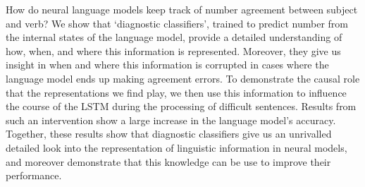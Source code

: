 How do neural language models keep track of number agreement between subject and verb? We show that ‘diagnostic classifiers', trained to predict number from the internal states of the language model, provide a detailed understanding of how, when, and where this information is represented. Moreover, they give us insight in when and where this information is corrupted in cases where the language model ends up making agreement errors. To demonstrate the causal role that the representations we find play, we then use this information to influence the course of the LSTM during the processing of difficult sentences. Results from such an intervention show a large increase in the language model's accuracy. Together, these results show that diagnostic classifiers give us an unrivalled detailed look into the representation of linguistic information in neural models, and moreover demonstrate that this knowledge can be use to improve their performance.
